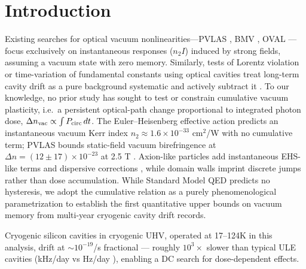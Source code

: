 \documentclass[11pt, a4paper]{article}
\begin{document}
\section{Introduction}
Existing searches for optical vacuum nonlinearities---PVLAS \cite{pvlas2020}, BMV \cite{battesti2013}, OVAL \cite{oval2017}---focus exclusively on instantaneous responses ($n_2 I$) induced by strong fields, assuming a vacuum state with zero memory. Similarly, tests of Lorentz violation or time-variation of fundamental constants using optical cavities treat long-term cavity drift as a pure background systematic and actively subtract it \cite{muller2003,kennedy2020}. To our knowledge, no prior study has sought to test or constrain cumulative vacuum plasticity, i.e.\ a persistent optical-path change proportional to integrated photon dose, $\Delta n_{\rm vac}\propto\int P_{\rm circ}\,dt$. The Euler--Heisenberg effective action \cite{heisenberg1936} predicts an instantaneous vacuum Kerr index $n_2\approx1.6\times10^{-33}$ cm$^2$/W \cite{vackerr2019} with no cumulative term; PVLAS bounds static-field vacuum birefringence at $\Delta n=(12\pm17)\times10^{-23}$ at 2.5 T \cite{pvlas2020}. Axion-like particles add instantaneous EHS-like terms \cite{alpehs2018} and dispersive corrections \cite{vackerr2019}, while domain walls imprint discrete jumps rather than dose accumulation. While Standard Model QED predicts no hysteresis, we adopt the cumulative relation as a purely phenomenological parametrization to establish the first quantitative upper bounds on vacuum memory from multi-year cryogenic cavity drift records.

Cryogenic silicon cavities in cryogenic UHV, operated at 17--124K in this analysis, drift at $\sim10^{-19}$/s fractional \cite{lee2026} --- roughly $10^3\times$ slower than typical ULE cavities (kHz/day vs Hz/day \cite{lee2026}), enabling a DC search for dose-dependent effects.
\end{document}
